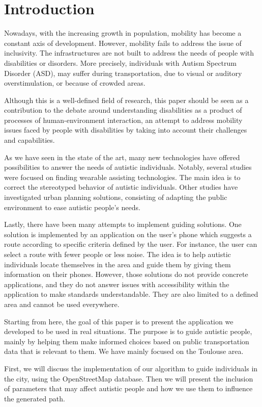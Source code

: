 \section{Introduction}


Nowadays, with the increasing growth in population, mobility has become a constant axis of development. However, mobility fails to address the issue of inclusivity. The infrastructures are not built to address the needs of people with disabilities or disorders. More precisely, individuals with Autism Spectrum Disorder (ASD), may suffer during transportation, due to visual or auditory overstimulation, or because of crowded areas.


Although this is a well-defined field of research, this paper should be seen as a contribution to the debate around understanding disabilities as a product of processes of human-environment interaction, an attempt to address mobility issues faced by people with disabilities by taking into account their challenges and capabilities.


As we have seen in the state of the art, many new technologies have offered possibilities to answer the needs of autistic individuals. Notably, several studies were focused on finding wearable assisting technologies. The main idea is to correct the stereotyped behavior of autistic individuals. Other studies have investigated urban planning solutions, consisting of adapting the public environment to ease autistic people's needs.


Lastly, there have been many attempts to implement guiding solutions. One solution is implemented by an application on the user’s phone which suggests a route according to specific criteria defined by the user. For instance, the user can select a route with fewer people or less noise. The idea is to help autistic individuals locate themselves in the area and guide them by giving them information on their phones. However, those solutions do not provide concrete applications, and they do not answer issues with accessibility within the application to make standards understandable. They are also limited to a defined area and cannot be used everywhere.


Starting from here, the goal of this paper is to present the application we developed to be used in real situations. The purpose is to guide autistic people, mainly by helping them make informed choices based on public transportation data that is relevant to them. We have mainly focused on the Toulouse area.


First, we will discuss the implementation of our algorithm to guide individuals in the city, using the OpenStreetMap database. Then we will present the inclusion of parameters that may affect autistic people and how we use them to influence the generated path.
